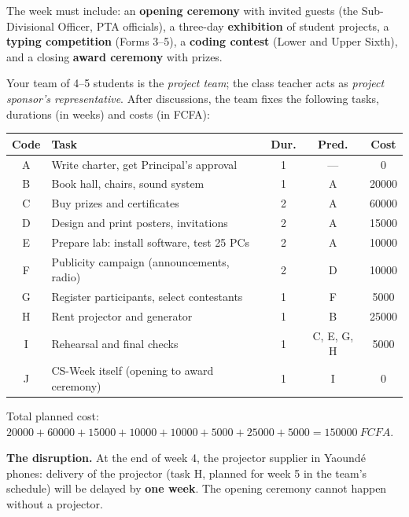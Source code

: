 \documentclass[11pt]{article}
\newcounter{popsec}
\newcounter{popsub}
\newcommand{\courssub}[1]{%
  \stepcounter{popsub}%
  \par\vspace{9pt}\noindent{\popxbold\fontsize{11.5}{13}\selectfont\color{popink}{\color{poporange}\thepopsec.\thepopsub}\hspace{6pt}#1}\par\nopagebreak\vspace{4pt}
}
\begin{document}
The week must include: an \textbf{opening ceremony} with invited guests (the Sub-Divisional Officer, PTA officials), a three-day \textbf{exhibition} of student projects, a \textbf{typing competition} (Forms 3--5), a \textbf{coding contest} (Lower and Upper Sixth), and a closing \textbf{award ceremony} with prizes.

Your team of 4--5 students is the \emph{project team}; the class teacher acts as \emph{project sponsor's representative}. After discussions, the team fixes the following tasks, durations (in weeks) and costs (in FCFA):

\begin{center}
\begin{tabularx}{\linewidth}{|c|X|c|c|c|}
\hline
\rowcolor{popblueL} \textbf{Code} & \textbf{Task} & \textbf{Dur.} & \textbf{Pred.} & \textbf{Cost} \\
\hline
A & Write charter, get Principal's approval & 1 & --- & 0 \\
\hline
B & Book hall, chairs, sound system & 1 & A & 20000 \\
\hline
C & Buy prizes and certificates & 2 & A & 60000 \\
\hline
D & Design and print posters, invitations & 2 & A & 15000 \\
\hline
E & Prepare lab: install software, test 25 PCs & 2 & A & 10000 \\
\hline
F & Publicity campaign (announcements, radio) & 2 & D & 10000 \\
\hline
G & Register participants, select contestants & 1 & F & 5000 \\
\hline
H & Rent projector and generator & 1 & B & 25000 \\
\hline
I & Rehearsal and final checks & 1 & C, E, G, H & 5000 \\
\hline
J & CS-Week itself (opening to award ceremony) & 1 & I & 0 \\
\hline
\end{tabularx}
\end{center}

Total planned cost: $20000+60000+15000+10000+10000+5000+25000+5000 = \SI{150000}{FCFA}$.

\textbf{The disruption.} At the end of week 4, the projector supplier in Yaoundé phones: delivery of the projector (task H, planned for week 5 in the team's schedule) will be delayed by \textbf{one week}. The opening ceremony cannot happen without a projector.

\courssub{Tasks}
\end{document}
